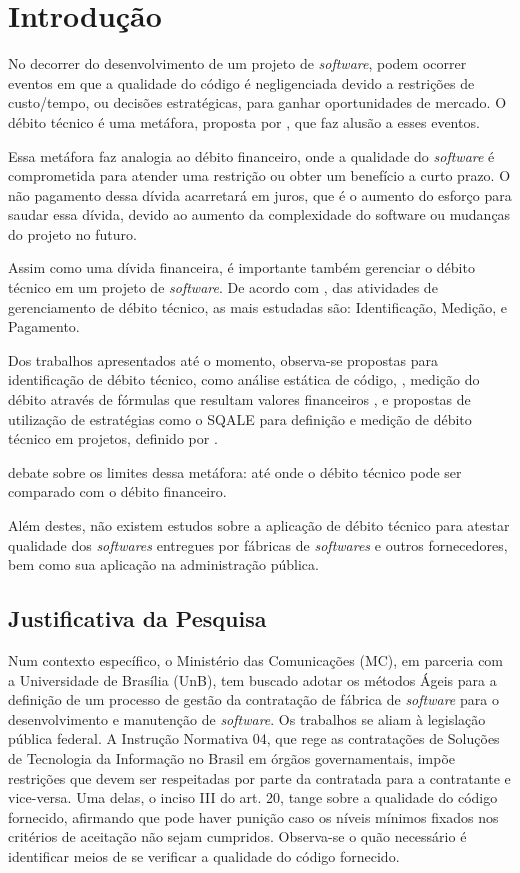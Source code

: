 \chapter[Introdução]{Introdução}

No decorrer do desenvolvimento de um projeto de \textit{software}, podem ocorrer eventos
em que a qualidade do código é negligenciada devido a restrições de custo/tempo,
ou decisões estratégicas, para ganhar oportunidades de mercado. O débito técnico
é uma metáfora, proposta por \cite{cunningham}, que faz alusão a esses eventos.

Essa metáfora faz analogia ao débito financeiro, onde a qualidade do \textit{software}
é comprometida para atender uma restrição ou obter um benefício a curto prazo. O não
pagamento dessa dívida acarretará em juros, que é o aumento do esforço para
saudar essa dívida, devido ao aumento da complexidade do software ou mudanças
do projeto no futuro.

Assim como uma dívida financeira, é importante também gerenciar o débito técnico
em um projeto de \textit{software}. De acordo com \cite{mapping}, das atividades de
gerenciamento de débito técnico, as mais estudadas são: Identificação, Medição,
e Pagamento.

Dos trabalhos apresentados até o momento, observa-se propostas para identificação de
débito técnico, como análise estática de código, \cite{siebra}, medição do débito
através de fórmulas que resultam valores financeiros \cite{principal}, e
propostas de utilização de estratégias como o SQALE para definição e medição de
débito técnico em projetos, definido por \cite{letouzey}.

\cite{schmid} debate sobre os limites dessa metáfora: até onde o débito técnico pode ser comparado
com o débito financeiro.

Além destes, não existem estudos sobre a aplicação de débito técnico para
atestar qualidade dos \textit{softwares} entregues por fábricas de \textit{softwares} e outros
fornecedores, bem como sua aplicação na administração pública.


\section{Justificativa da Pesquisa}
Num contexto específico, o Ministério das Comunicações (MC), em parceria com a
Universidade de Brasília (UnB), tem buscado adotar os métodos Ágeis para a
definição de um processo de gestão da contratação de fábrica de \textit{software} para o
desenvolvimento e manutenção de \textit{software}.
Os trabalhos se aliam à legislação pública federal. A Instrução Normativa 04,
que rege as contratações de Soluções de Tecnologia da Informação no
 Brasil em órgãos governamentais, impõe restrições que devem ser respeitadas por
 parte da contratada para a contratante e vice-versa. Uma delas, o inciso III do
 art. 20, tange sobre a qualidade do código fornecido, afirmando que pode haver
 punição caso os níveis mínimos fixados nos critérios de aceitação não sejam
 cumpridos. Observa-se o quão necessário é identificar meios de se verificar a
 qualidade do código fornecido.

